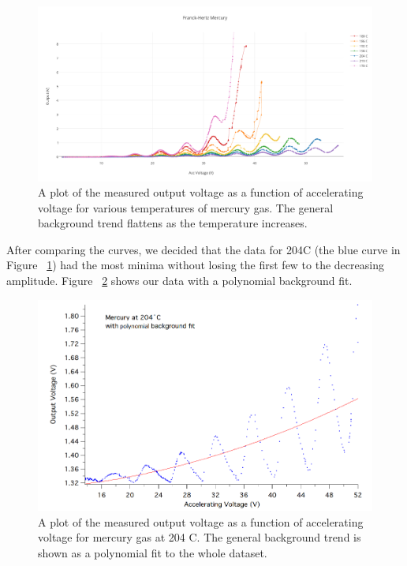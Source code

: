 \documentclass[prb,preprint]{revtex4-1}
\begin{document}
\begin{figure}[h!]
\centering
\includegraphics[width=6in]{alltemps.pdf}
\caption{A plot of the measured output voltage as a function of accelerating voltage for various temperatures of mercury gas. The general background trend flattens as the temperature increases.}
\label{alltemps}
\end{figure}


After comparing the curves, we decided that the data for 204\degree C (the blue curve in Figure ~\ref{alltemps}) had the most minima without losing the first few to the decreasing amplitude. Figure ~\ref{204CbackFit} shows our data with a polynomial background fit. 

\begin{figure}[h!]
\centering
\includegraphics[width=6in]{204C_backFit.png}
\caption{A plot of the measured output voltage as a function of accelerating voltage for mercury gas at 204 \degree C. The general background trend is shown as a polynomial fit to the whole dataset.}
\label{204CbackFit}
\end{figure}
\end{document}
